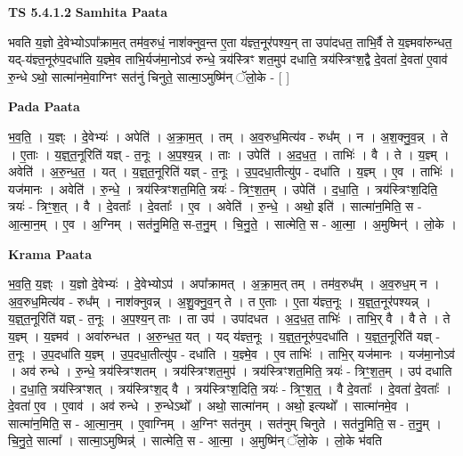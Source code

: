 \documentclass[17pt]{extarticle}
\begin{document}
\textbf{TS 5.4.1.2 } \newline
\textbf{Samhita Paata} \newline

भवति य॒ज्ञो दे॒वेभ्योऽपा᳚क्राम॒त् तम॑व॒रुधं॒ नाश॑क्नुव॒न्त ए॒ता य॑ज्ञ्त॒नूर॑पश्य॒न् ता उपा॑दधत॒ ताभि॒र्वै ते य॒ज्ञ्मवा॑रुन्धत॒ यद्-य॑ज्ञ्त॒नूरु॑प॒दधा॑ति य॒ज्ञ्मे॒व ताभि॒र्यज॑मा॒नोऽव॑ रुन्धे॒ त्रय॑स्त्रिꣳ शत॒मुप॑ दधाति॒ त्रय॑स्त्रिꣳश॒द्वै दे॒वता॑ दे॒वता॑ ए॒वाव॑ रु॒न्धे ऽथो॒ सात्मा॑नमे॒वाग्निꣳ सत॑नुं चिनुते॒ सात्मा॒ऽमुष्मि॑न् ॅलो॒के - [  ] \newline

\textbf{Pada Paata} \newline

भ॒व॒ति॒ । य॒ज्ञ्ः । दे॒वेभ्यः॑ । अपेति॑ । अ॒क्रा॒म॒त् । तम् । अ॒व॒रुध॒मित्य॑व - रुध᳚म् । न । अ॒श॒क्नु॒व॒न्न् । ते । ए॒ताः । य॒ज्ञ्॒त॒नूरिति॑ यज्ञ् - त॒नूः । अ॒प॒श्य॒न्न् । ताः । उपेति॑ । अ॒द॒ध॒त॒ । ताभिः॑ । वै । ते । य॒ज्ञ्म् । अवेति॑ । अ॒रु॒न्ध॒त॒ । यत् । य॒ज्ञ्॒त॒नूरिति॑ यज्ञ् - त॒नूः । उ॒प॒दधा॒तीत्यु॑प - दधा॑ति । य॒ज्ञ्म् । ए॒व । ताभिः॑ । यज॑मानः । अवेति॑ । रु॒न्धे॒ । त्रय॑स्त्रिꣳशत॒मिति॒ त्रयः॑ - त्रिꣳ॒॒श॒त॒म् । उपेति॑ । द॒धा॒ति॒ । त्रय॑स्त्रिꣳश॒दिति॒ त्रयः॑ - त्रिꣳ॒॒श॒त् । वै । दे॒वताः᳚ । दे॒वताः᳚ । ए॒व । अवेति॑ । रु॒न्धे॒ । अथो॒ इति॑ । सात्मा॑न॒मिति॒ स - आ॒त्मा॒न॒म् । ए॒व । अ॒ग्निम् । सत॑नु॒मिति॒ स-त॒नु॒म् । चि॒नु॒ते॒ । सात्मेति॒ स - आ॒त्मा॒ । अ॒मुष्मिन्॑ । लो॒के ।  \newline


\textbf{Krama Paata} \newline

भ॒व॒ति॒ य॒ज्ञ्ः । य॒ज्ञो दे॒वेभ्यः॑ । दे॒वेभ्योऽप॑ । अपा᳚क्रामत् । अ॒क्रा॒म॒त् तम् । तम॑व॒रुध᳚म् । अ॒व॒रुध॒म् न । अ॒व॒रुध॒मित्य॑व - रुध᳚म् । नाश॑क्नुवन्न् । अ॒शु॒क्नु॒व॒न् ते । त ए॒ताः । ए॒ता य॑ज्ञ्त॒नूः । य॒ज्ञ्॒त॒नूर॑पश्यन्न् । य॒ज्ञ्॒त॒नूरिति॑ यज्ञ् - त॒नूः । अ॒प॒श्य॒न् ताः । ता उप॑ । उपा॑दधत । अ॒द॒ध॒त॒ ताभिः॑ । ताभि॒र् वै । वै ते । ते य॒ज्ञ्म् । य॒ज्ञ्मव॑ । अवा॑रुन्धत । अ॒रु॒न्ध॒त॒ यत् । यद् य॑ज्ञ्त॒नूः । य॒ज्ञ्॒त॒नूरु॑प॒दधा॑ति । य॒ज्ञ्॒त॒नूरिति॑ यज्ञ् - त॒नूः । उ॒प॒दधा॑ति य॒ज्ञ्म् । उ॒प॒दधा॒तीत्यु॑प - दधा॑ति । य॒ज्ञ्मे॒व । ए॒व ताभिः॑ । ताभि॒र् यज॑मानः । यज॑मा॒नोऽव॑ । अव॑ रुन्धे । रु॒न्धे॒ त्रय॑स्त्रिꣳशतम् । त्रय॑स्त्रिꣳशत॒मुप॑ । त्रय॑स्त्रिꣳशत॒मिति॒ त्रयः॑ - त्रिꣳ॒॒श॒त॒म् । उप॑ दधाति । द॒धा॒ति॒ त्रय॑स्त्रिꣳशत् । त्रय॑स्त्रिꣳश॒द् वै । त्रय॑स्त्रिꣳश॒दिति॒ त्रयः॑ - त्रिꣳ॒॒श॒त्॒ । वै दे॒वताः᳚ । दे॒वता॑ दे॒वताः᳚ । दे॒वता॑ ए॒व । ए॒वाव॑ । अव॑ रुन्धे । रु॒न्धेऽथो᳚ । अथो॒ सात्मा॑नम् । अथो॒ इत्यथो᳚ । सात्मा॑नमे॒व । सात्मा॑न॒मिति॒ स - आ॒त्मा॒न॒म् । ए॒वाग्निम् । अ॒ग्निꣳ सत॑नुम् । सत॑नुम् चिनुते । सत॑नु॒मिति॒ स - त॒नु॒म् । चि॒नु॒ते॒ सात्मा᳚ । सात्मा॒ऽमुष्मिन्न्॑ । सात्मेति॒ स - आ॒त्मा॒ । अ॒मुष्मि॑न् ॅलो॒के । लो॒के भ॑वति \newline
\end{document}
